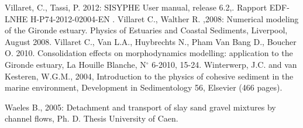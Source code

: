 Villaret, C., Tassi, P. 2012{\nobreakspace}: SISYPHE User manual, release
6.2,. Rapport EDF-LNHE H-P74-2012-02004-EN .\newline
Villaret C., Walther R. ,2008: Numerical modeling of the Gironde estuary.
Physics of Estuaries and Coastal Sediments, Liverpool, August 2008.\newline
Villaret C., Van L.A., Huybrechts N., Pham Van Bang D., Boucher O. 2010.
Consolidation effects on morphodynamics modelling: application to the
Gironde estuary, La Houille Blanche, N$^\circ$ 6-2010, 15-24.\newline
Winterwerp, J.C. and van Kesteren, W.G.M., 2004, Introduction to the physics
of cohesive sediment in the marine environment, Development in Sedimentology
56, Elsevier (466 pages).

Waeles B., 2005: Detachment and transport of slay sand gravel mixtures by
channel flows, Ph. D. Thesis University of Caen.



